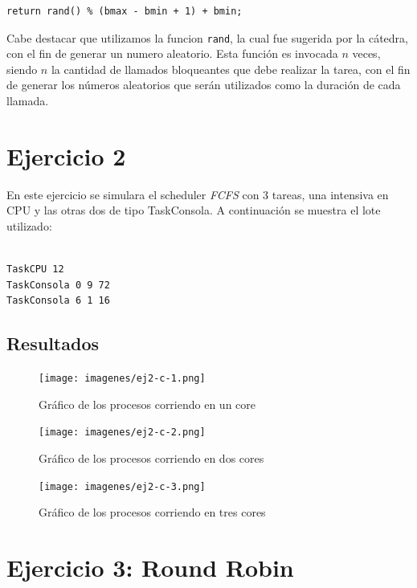 \documentclass[a4paper]{article}
\begin{document}
\begin{verbatim}
return rand() % (bmax - bmin + 1) + bmin;
\end{verbatim}

Cabe destacar que utilizamos la funcion \verb|rand|, la cual fue sugerida
por la cátedra, con el fin de generar un numero aleatorio. Esta función es
invocada $n$ veces, siendo $n$ la cantidad de llamados bloqueantes que debe
realizar la tarea, con el fin de generar los números aleatorios que serán
utilizados como la duración de cada llamada.

\section{Ejercicio 2}
En este ejercicio se simulara el scheduler \textit{FCFS} con 3 tareas, una 
intensiva en CPU y las otras dos de tipo TaskConsola. A continuación se
muestra el lote utilizado:
\begin{verbatim}

TaskCPU 12
TaskConsola 0 9 72
TaskConsola 6 1 16

\end{verbatim}

\subsection{Resultados}

\begin{figure}[htb]
\begin{center}
\texttt{[image: imagenes/ej2-c-1.png]}
\end{center}
\caption{Gráfico de los procesos corriendo en un core}
\end{figure}

\begin{figure}[htb]
\begin{center}
\texttt{[image: imagenes/ej2-c-2.png]}
\end{center}
\caption{Gráfico de los procesos corriendo en dos cores}
\end{figure}

\begin{figure}[htb]
\begin{center}
\texttt{[image: imagenes/ej2-c-3.png]}
\end{center}
\caption{Gráfico de los procesos corriendo en tres cores}
\end{figure}

\newpage

\section{Ejercicio 3: Round Robin}
\end{document}

